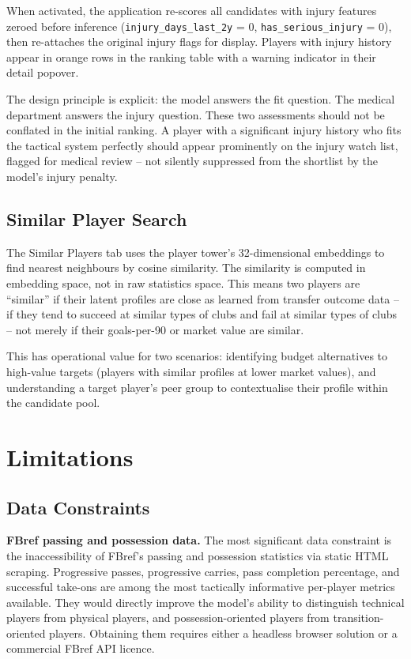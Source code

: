 \documentclass[12pt, a4paper, oneside]{report}
\begin{document}
When activated, the application re-scores all candidates with injury features zeroed before inference (\texttt{injury\_days\_last\_2y} = 0, \texttt{has\_serious\_injury} = 0), then re-attaches the original injury flags for display. Players with injury history appear in orange rows in the ranking table with a warning indicator in their detail popover.

The design principle is explicit: the model answers the fit question. The medical department answers the injury question. These two assessments should not be conflated in the initial ranking. A player with a significant injury history who fits the tactical system perfectly should appear prominently on the injury watch list, flagged for medical review -- not silently suppressed from the shortlist by the model's injury penalty.

\section{Similar Player Search}

The Similar Players tab uses the player tower's 32-dimensional embeddings to find nearest neighbours by cosine similarity. The similarity is computed in embedding space, not in raw statistics space. This means two players are ``similar'' if their latent profiles are close as learned from transfer outcome data -- if they tend to succeed at similar types of clubs and fail at similar types of clubs -- not merely if their goals-per-90 or market value are similar.

This has operational value for two scenarios: identifying budget alternatives to high-value targets (players with similar profiles at lower market values), and understanding a target player's peer group to contextualise their profile within the candidate pool.

\chapter{Limitations}
\label{chap:limitations}

\section{Data Constraints}

\textbf{FBref passing and possession data.} The most significant data constraint is the inaccessibility of FBref's passing and possession statistics via static HTML scraping. Progressive passes, progressive carries, pass completion percentage, and successful take-ons are among the most tactically informative per-player metrics available. They would directly improve the model's ability to distinguish technical players from physical players, and possession-oriented players from transition-oriented players. Obtaining them requires either a headless browser solution or a commercial FBref API licence.
\end{document}
